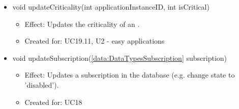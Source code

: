 \begin{description}
\begin{itemize}[noitemsep,nolistsep,leftmargin=-.25cm]
\begin{itemize}
        \end{itemize}
      \item \textsf{void updateCriticality(int applicationInstanceID, int isCritical)}
        \begin{itemize}[noitemsep,nolistsep]
           \item Effect: Updates the criticality of an .
\item Created for: UC19.11, U2 - easy applications
        \end{itemize}
      \item \textsf{void updateSubscription(\ref{data:DataTypesSubscription} subscription)}
        \begin{itemize}[noitemsep,nolistsep]
           \item Effect: Updates a subscription in the database (e.g. change state to 'disabled').
\item Created for: UC18
        \end{itemize}
    \end{itemize}
    \end{description}

